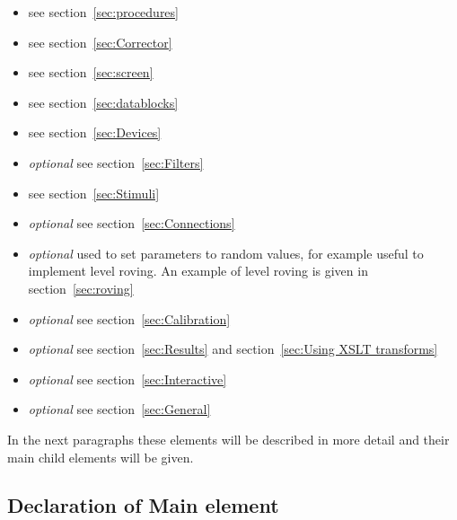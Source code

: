\begin{itemize}
\item {} see section~\ref{sec:procedures}

\item {} see section~\ref{sec:Corrector}

\item {} see section~\ref{sec:screen}

\item {} see section~\ref{sec:datablocks}

\item {} see section~\ref{sec:Devices}

\item {} \emph{optional} see
section~\ref{sec:Filters}

\item {} see section~\ref{sec:Stimuli}

\item {} \emph{optional} see
section~\ref{sec:Connections}

\item {} \emph{optional} used to set
parameters to random values, for example useful to implement level
roving. An example of level roving is given in
section~\ref{sec:roving}

\item {} \emph{optional} see
section~\ref{sec:Calibration}

\item {}\emph{optional} see
section~\ref{sec:Results} and section~\ref{sec:Using XSLT
transforms}


\item {}\emph{optional} see
section~\ref{sec:Interactive}

\item {}\emph{optional} see
section~\ref{sec:General}
\end{itemize}

In the next paragraphs these elements will be described in more
detail and their main child elements will be given.

\subsection{Declaration of Main  element}

